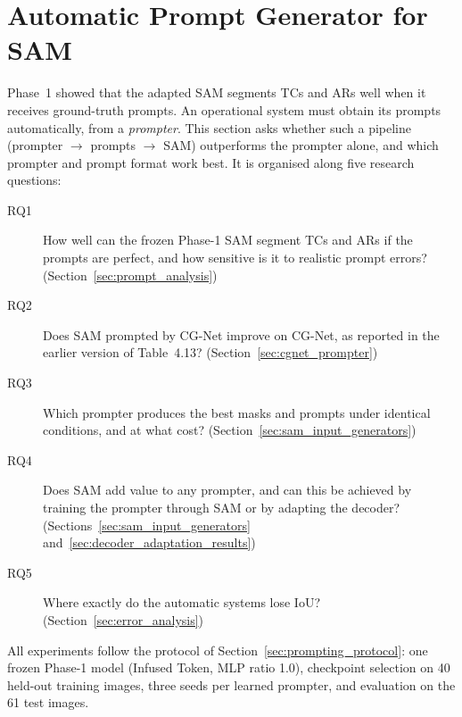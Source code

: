 
\section{Automatic Prompt Generator for SAM}
\label{sec:auto_prompt_results}

Phase~1 showed that the adapted SAM segments TCs and ARs well when it receives ground-truth prompts. An operational
system must obtain its prompts automatically, from a \emph{prompter}. This section asks whether such a pipeline
(prompter $\rightarrow$ prompts $\rightarrow$ SAM) outperforms the prompter alone, and which prompter and prompt format
work best. It is organised along five research questions:
\begin{description}
  \item[RQ1] How well can the frozen Phase-1 SAM segment TCs and ARs if the prompts are perfect, and how sensitive is it
  to realistic prompt errors? (Section~\ref{sec:prompt_analysis})
  \item[RQ2] Does SAM prompted by CG-Net improve on CG-Net, as reported in the earlier version of Table~4.13?
  (Section~\ref{sec:cgnet_prompter})
  \item[RQ3] Which prompter produces the best masks and prompts under identical conditions, and at what cost?
  (Section~\ref{sec:sam_input_generators})
  \item[RQ4] Does SAM add value to any prompter, and can this be achieved by training the prompter through SAM or by
  adapting the decoder? (Sections~\ref{sec:sam_input_generators} and~\ref{sec:decoder_adaptation_results})
  \item[RQ5] Where exactly do the automatic systems lose IoU? (Section~\ref{sec:error_analysis})
\end{description}
All experiments follow the protocol of Section~\ref{sec:prompting_protocol}: one frozen Phase-1 model (Infused Token,
MLP ratio 1.0), checkpoint selection on 40 held-out training images, three seeds per learned prompter, and evaluation
on the 61 test images.


